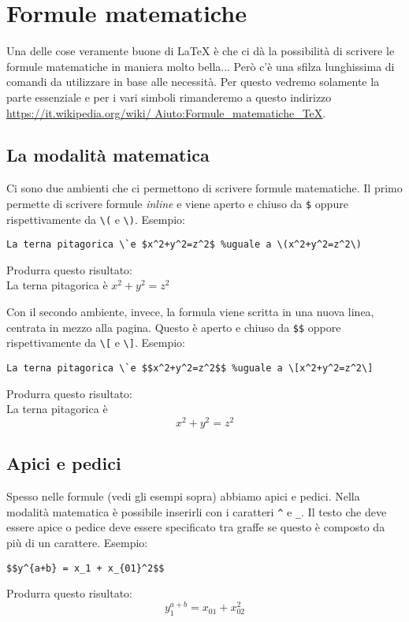 \chapter{Formule matematiche}
Una delle cose veramente buone di \LaTeX{} è che ci dà la possibilità di 
scrivere le formule matematiche in maniera molto bella... Però c'è una sfilza 
lunghissima di comandi da utilizzare in base alle necessità. Per questo 
vedremo solamente la parte essenziale e per i vari simboli rimanderemo a 
questo indirizzo \url{https://it.wikipedia.org/wiki/
Aiuto:Formule_matematiche_TeX}.

\section{La modalità matematica}
Ci sono due ambienti che ci permettono di scrivere formule matematiche. Il 
primo permette di scrivere formule \textit{inline} e viene aperto e chiuso da 
\verb!$! oppure rispettivamente da \verb!\(! e \verb!\)!. Esempio:
\begin{lstlisting}
La terna pitagorica \`e $x^2+y^2=z^2$ %uguale a \(x^2+y^2=z^2\)
\end{lstlisting}
Produrra questo risultato:\\
La terna pitagorica \`e $x^2+y^2=z^2$
\\ \par
Con il secondo ambiente, invece, la formula viene scritta in una nuova linea, 
centrata in mezzo alla pagina. Questo è aperto e chiuso da \verb!$$! oppore 
rispettivamente da \verb!\[! e \verb!\]!. Esempio:
\begin{lstlisting}
La terna pitagorica \`e $$x^2+y^2=z^2$$ %uguale a \[x^2+y^2=z^2\]
\end{lstlisting}
Produrra questo risultato:\\
La terna pitagorica \`e $$x^2+y^2=z^2$$

\section{Apici e pedici}
Spesso nelle formule (vedi gli esempi sopra) abbiamo apici e pedici. Nella 
modalità matematica è possibile inserirli con i caratteri \verb!^! e \verb!_!. 
Il testo che deve essere apice o pedice deve essere specificato tra graffe se 
questo è composto da più di un carattere. Esempio:
\begin{lstlisting}
$$y^{a+b} = x_1 + x_{01}^2$$
\end{lstlisting}
Produrra questo risultato:\\
$$y_1^{a+b} = x_{01} + x_{02}^2$$


